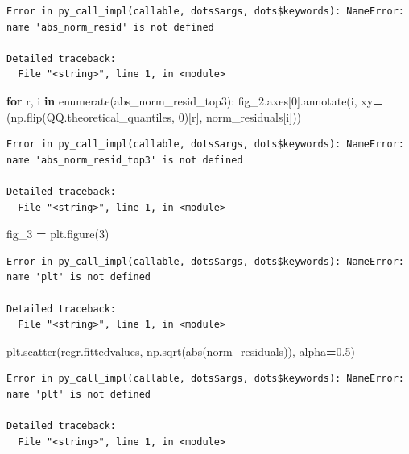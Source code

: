 \documentclass[]{book}
\newenvironment{Shaded}{\begin{snugshade}}{\end{snugshade}}
\newcommand{\BuiltInTok}[1]{#1}
\newcommand{\ControlFlowTok}[1]{\textcolor[rgb]{0.13,0.29,0.53}{\textbf{#1}}}
\newcommand{\DecValTok}[1]{\textcolor[rgb]{0.00,0.00,0.81}{#1}}
\newcommand{\FloatTok}[1]{\textcolor[rgb]{0.00,0.00,0.81}{#1}}
\newcommand{\KeywordTok}[1]{\textcolor[rgb]{0.13,0.29,0.53}{\textbf{#1}}}
\newcommand{\NormalTok}[1]{#1}
\newcommand{\OperatorTok}[1]{\textcolor[rgb]{0.81,0.36,0.00}{\textbf{#1}}}
\begin{document}
\begin{verbatim}
Error in py_call_impl(callable, dots$args, dots$keywords): NameError: name 'abs_norm_resid' is not defined

Detailed traceback: 
  File "<string>", line 1, in <module>
\end{verbatim}

\begin{Shaded}
\begin{Highlighting}[]
\ControlFlowTok{for}\NormalTok{ r, i }\KeywordTok{in} \BuiltInTok{enumerate}\NormalTok{(abs_norm_resid_top3):}
\NormalTok{    fig_2.axes[}\DecValTok{0}\NormalTok{].annotate(i, }
\NormalTok{                               xy}\OperatorTok{=}\NormalTok{(np.flip(QQ.theoretical_quantiles, }\DecValTok{0}\NormalTok{)[r],}
\NormalTok{                                   norm_residuals[i]))}
\end{Highlighting}
\end{Shaded}

\begin{verbatim}
Error in py_call_impl(callable, dots$args, dots$keywords): NameError: name 'abs_norm_resid_top3' is not defined

Detailed traceback: 
  File "<string>", line 1, in <module>
\end{verbatim}

\begin{Shaded}
\begin{Highlighting}[]
\NormalTok{fig_3 }\OperatorTok{=}\NormalTok{ plt.figure(}\DecValTok{3}\NormalTok{)}
\end{Highlighting}
\end{Shaded}

\begin{verbatim}
Error in py_call_impl(callable, dots$args, dots$keywords): NameError: name 'plt' is not defined

Detailed traceback: 
  File "<string>", line 1, in <module>
\end{verbatim}

\begin{Shaded}
\begin{Highlighting}[]
\NormalTok{plt.scatter(regr.fittedvalues, np.sqrt(}\BuiltInTok{abs}\NormalTok{(norm_residuals)), alpha}\OperatorTok{=}\FloatTok{0.5}\NormalTok{)}
\end{Highlighting}
\end{Shaded}

\begin{verbatim}
Error in py_call_impl(callable, dots$args, dots$keywords): NameError: name 'plt' is not defined

Detailed traceback: 
  File "<string>", line 1, in <module>
\end{verbatim}
\end{document}
